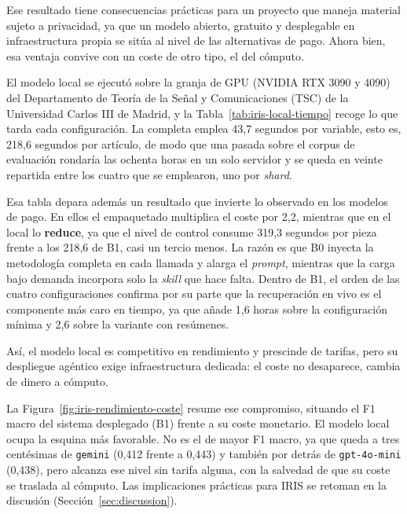 Ese resultado tiene consecuencias prácticas para un proyecto que maneja material
sujeto a privacidad, ya que un modelo abierto, gratuito y desplegable en
infraestructura propia se sitúa al nivel de las alternativas de pago. Ahora bien,
esa ventaja convive con un coste de otro tipo, el del cómputo.

El modelo local se ejecutó sobre la granja de GPU (NVIDIA RTX 3090 y 4090) del
Departamento de Teoría de la Señal y Comunicaciones (TSC) de la Universidad Carlos III
de Madrid, y la Tabla~\ref{tab:iris-local-tiempo} recoge lo que tarda cada
configuración. La completa emplea 43,7 segundos por variable, esto es, 218,6 segundos
por artículo, de modo que una pasada sobre el corpus de evaluación rondaría las
ochenta horas en un solo servidor y se queda en veinte repartida entre los cuatro que
se emplearon, uno por \textit{shard}.

Esa tabla depara además un resultado que invierte lo observado en los modelos de pago.
En ellos el empaquetado multiplica el coste por 2,2, mientras que en el local lo
\textbf{reduce}, ya que el nivel de control consume 319,3 segundos por pieza frente a
los 218,6 de B1, casi un tercio menos. La razón es que B0 inyecta la metodología
completa en cada llamada y alarga el \textit{prompt}, mientras que la carga bajo
demanda incorpora solo la \textit{skill} que hace falta. Dentro de B1, el orden de las
cuatro configuraciones confirma por su parte que la recuperación en vivo es el
componente más caro en tiempo, ya que añade 1,6 horas sobre la configuración mínima y
2,6 sobre la variante con resúmenes.

Así, el modelo local es competitivo en rendimiento y
prescinde de tarifas, pero su despliegue agéntico exige infraestructura dedicada: el
coste no desaparece, cambia de dinero a cómputo.



La Figura~\ref{fig:iris-rendimiento-coste} resume ese compromiso, situando el F1
macro del sistema desplegado (B1) frente a su coste monetario. El modelo local ocupa
la esquina más favorable. No es el de mayor F1 macro, ya que queda a tres centésimas
de \texttt{gemini} (0,412 frente a 0,443) y también por detrás de \texttt{gpt-4o-mini}
(0,438), pero alcanza ese nivel sin tarifa alguna, con la salvedad de que su coste se
traslada al cómputo. Las implicaciones prácticas para IRIS se retoman en la discusión
(Sección~\ref{sec:discussion}).


